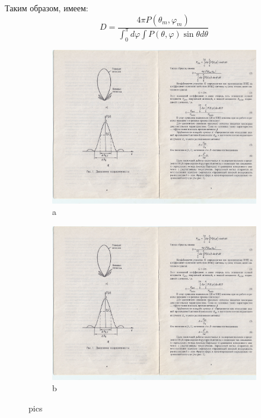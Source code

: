 Таким образом, имеем:
\begin{equation}
    D=\frac{4 \pi P\left(\theta_{m}, \varphi_{m}\right)}{\int_{0}^{\pi} d \varphi \int P(\theta, \varphi) \sin \theta d \theta}
    \label{eq:2}    
\end{equation}

\begin{center}
    \begin{figure}[h!]
        \begin{subfigure}[b]{.49\linewidth}
            \centering
            \includegraphics[width = \linewidth]{100HPAIO/SCAN0208.JPG}
            \caption{a}
            \label{fig:1:a}
        \end{subfigure}
        \begin{subfigure}[b]{.49\linewidth}
            \centering
            \includegraphics[width = \linewidth]{100HPAIO/SCAN0208.JPG}
            \caption{b}
            \label{fig:1:b}
        \end{subfigure}
        \caption{pics}
        \label{fig:1}
    \end{figure}
\end{center}

